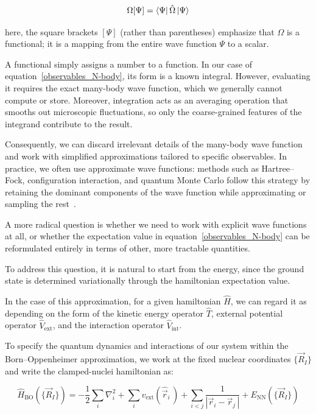 \begin{equation}
\Omega[\Psi] = \bra{\Psi}\hat{\Omega}\ket{\Psi}
\label{observables_functional}
\end{equation}

here, the square brackets $[\Psi]$ (rather than parentheses) emphasize that $\Omega$ is a functional; it is a mapping from the entire wave function $\Psi$ to a scalar.

A functional simply assigns a number to a function. In our case of equation~\eqref{observables_N-body}, its form is a known integral. However, evaluating it requires the exact many-body wave function, which we generally cannot compute or store. Moreover, integration acts as an averaging operation that smooths out microscopic fluctuations, so only the coarse-grained features of the integrand contribute to the result.

Consequently, we can discard irrelevant details of the many-body wave function and work with simplified approximations tailored to specific observables.
In practice, we often use approximate wave functions: methods such as Hartree--Fock, configuration interaction, and quantum Monte Carlo follow this strategy by retaining the dominant components of the wave function while approximating or sampling the rest~\cite{foulkes2001quantum}.

A more radical question is whether we need to work with explicit wave functions at all, or whether the expectation value in equation~\eqref{observables_N-body} can be reformulated entirely in terms of other, more tractable quantities.

To address this question, it is natural to start from the energy, since the ground state is determined variationally through the hamiltonian expectation value.

In the case of this approximation, for a given hamiltonian $\hat{H}$, we can regard it as depending on the form of the kinetic energy operator $\hat{T}$, external potential operator $\hat{V}_\mathrm{ext}$, and the interaction operator $\hat{V}_\mathrm{int}$.

To specify the quantum dynamics and interactions of our system within the Born--Oppenheimer approximation,
we work at the fixed nuclear coordinates $\{\vec{R}_I\}$ and write the clamped-nuclei hamiltonian as:

\begin{equation}
    \hat{H}_\mathrm{BO}(\{\vec{R}_I\})
    = -\frac{1}{2}\sum_i\nabla_i^2
    + \sum_i v_{\mathrm{ext}}(\hat{\vec{r}}_i\,)
    + \sum_{i<j}\frac{1}{|\vec{r}_i - \vec{r}_j\,|}
    + E_\mathrm{NN}(\{\vec{R}_I\})
\label{BO_hamiltonian}
\end{equation}


